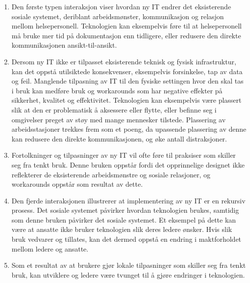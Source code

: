 \begin{enumerate}
\item Den første typen interaksjon viser hvordan ny IT endrer det eksisterende sosiale systemet, deriblant arbeidsmønster, kommunikasjon og relasjon mellom helsepersonell. Teknologien kan eksempelvis føre til at helsepersonell må bruke mer tid på dokumentasjon enn tidligere, eller redusere den direkte kommunikasjonen ansikt-til-ansikt.
\item Dersom ny IT ikke er tilpasset eksisterende teknisk og fysisk infrastruktur, kan det oppstå utilsiktede konsekvenser, eksempelvis forsinkelse, tap av data og feil. Manglende tilpasning av IT til den fysiske settingen hvor den skal tas i bruk kan medføre bruk og workarounds som har negative effekter på sikkerhet, kvalitet og effektivitet. Teknologien kan eksempelvis være plassert slik at den er problematisk å aksessere eller flytte, eller befinne seg i omgivelser preget av støy med mange mennesker tilstede. Plassering av arbeidsstasjoner trekkes frem som et poeng, da upassende plassering av denne kan redusere den direkte kommunikasjonen, og øke antall distraksjoner. 
\item Fortolkninger og tilpasninger av ny IT vil ofte føre til praksiser som skiller seg fra tenkt bruk. Denne bruken oppstår fordi det opprinnelige designet ikke reflekterer de eksisterende arbeidsmønstre og sosiale relasjoner, og workarounds oppstår som resultat av dette.
\item Den fjerde interaksjonen illustrerer at implementering av ny IT er en rekursiv prosess. Det sosiale systemet påvirker hvordan teknologien brukes, samtidig som denne bruken påvirker det sosiale systemet. Et eksempel på dette kan være at ansatte ikke bruker teknologien slik deres ledere ønsker. Hvis slik bruk vedvarer og tillates, kan det dermed oppstå en endring i maktforholdet mellom ledere og ansatte.  
\item Som et resultat av at brukere gjør lokale tilpasninger som skiller seg fra tenkt bruk, kan utviklere og ledere være tvunget til å gjøre endringer i teknologien.
\end{enumerate}



